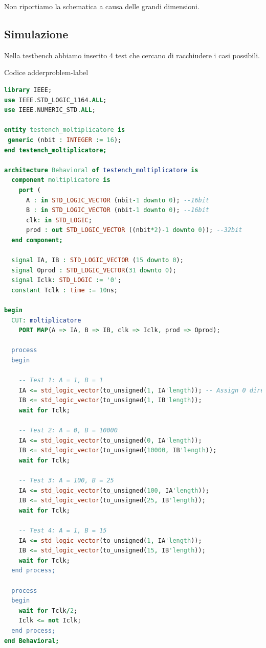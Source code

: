 Non riportiamo la schematica a causa delle grandi dimensioni.

\subsection{Simulazione}
Nella testbench abbiamo inserito 4 test che cercano di racchiudere i casi possibili.

\begin{problem}{Codice adder}{problem-label}
\begin{lstlisting}[language=VHDL]
library IEEE;
use IEEE.STD_LOGIC_1164.ALL;
use IEEE.NUMERIC_STD.ALL;

entity testench_moltiplicatore is
 generic (nbit : INTEGER := 16);
end testench_moltiplicatore;

architecture Behavioral of testench_moltiplicatore is
  component moltiplicatore is
    port ( 
      A : in STD_LOGIC_VECTOR (nbit-1 downto 0); --16bit
      B : in STD_LOGIC_VECTOR (nbit-1 downto 0); --16bit
      clk: in STD_LOGIC;
      prod : out STD_LOGIC_VECTOR ((nbit*2)-1 downto 0)); --32bit
  end component;
  
  signal IA, IB : STD_LOGIC_VECTOR (15 downto 0);
  signal Oprod : STD_LOGIC_VECTOR(31 downto 0);
  signal Iclk: STD_LOGIC := '0';
  constant Tclk : time := 10ns;
  
begin
  CUT: moltiplicatore 
    PORT MAP(A => IA, B => IB, clk => Iclk, prod => Oprod);

  process
  begin
    
    -- Test 1: A = 1, B = 1
    IA <= std_logic_vector(to_unsigned(1, IA'length)); -- Assign 0 directly
    IB <= std_logic_vector(to_unsigned(1, IB'length));
    wait for Tclk;
 
    -- Test 2: A = 0, B = 10000
    IA <= std_logic_vector(to_unsigned(0, IA'length));
    IB <= std_logic_vector(to_unsigned(10000, IB'length));
    wait for Tclk;
   
    -- Test 3: A = 100, B = 25
    IA <= std_logic_vector(to_unsigned(100, IA'length));
    IB <= std_logic_vector(to_unsigned(25, IB'length));
    wait for Tclk;    
    
    -- Test 4: A = 1, B = 15
    IA <= std_logic_vector(to_unsigned(1, IA'length));
    IB <= std_logic_vector(to_unsigned(15, IB'length));
    wait for Tclk;
  end process;
  
  process
  begin
    wait for Tclk/2;
    Iclk <= not Iclk;
  end process;
end Behavioral;
\end{lstlisting}
\end{problem}


